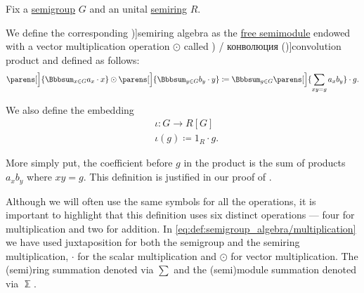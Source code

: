 \begin{definition}\label{def:semigroup_algebra}
  Fix a \hyperref[def:semigroup]{semigroup} \( G \) and an unital \hyperref[def:semiring]{semiring} \( R \).

  We define the corresponding \term[ru=групповая алгебра (\cite[504]{Винберг2014})]{semiring algebra} as the \hyperref[def:free_semimodule]{free semimodule} endowed with a vector multiplication operation \( \odot \) called \term[ru=свёртка (\cite[62]{Боровков1999Вероятности}) / конволюция (\cite[179]{ИоффеТихомиров1974})]{convolution product} and defined as follows:
  \begin{equation}\label{eq:def:semigroup_algebra/multiplication}
    \parens[\Big]{ \Bbbsum_{x \in G} a_x \cdot x } \odot \parens[\Big]{ \Bbbsum_{y \in G} b_y \cdot y }
    \coloneqq
    \Bbbsum_{g \in G} \parens[\Big]{ \sum_{xy = g} a_x b_y } \cdot g.
  \end{equation}

  We also define the embedding
  \begin{equation}\label{eq:def:semigroup_algebra/embedding}
    \begin{aligned}
      &\iota: G \to R[G] \\
      &\iota(g) \coloneqq 1_R \cdot g.
    \end{aligned}
  \end{equation}
\end{definition}
\begin{comments}
  \item More simply put, the coefficient before \( g \) in the product is the sum of products \( a_x b_y \) where \( xy = g \). This definition is justified in our proof of .

  \item Although we will often use the same symbols for all the operations, it is important to highlight that this definition uses six distinct operations --- four for multiplication and two for addition. In \eqref{eq:def:semigroup_algebra/multiplication} we have used juxtaposition for both the semigroup and the semiring multiplication, \( \cdot \) for the scalar multiplication and \( \odot \) for vector multiplication. The (semi)ring summation denoted via \( \sum \) and the (semi)module summation denoted via \( \Bbbsum \).
\end{comments}

